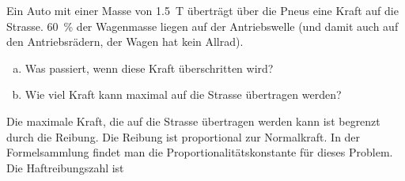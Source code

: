 \begin{aufgabe}
	Ein Auto mit einer Masse von \SI{1.5}{T} überträgt über die Pneus eine Kraft auf die Strasse.
	\SI{60}{\percent} der Wagenmasse liegen auf der Antriebswelle (und damit auch auf den Antriebsrädern, der Wagen hat kein Allrad).
	\begin{enumerate} [a)]
		\item Was passiert, wenn diese Kraft überschritten wird?
		\item Wie viel Kraft kann maximal auf die Strasse übertragen werden?
	\end{enumerate}
	\begin{loesung}
		Die maximale Kraft, die auf die Strasse übertragen werden kann ist begrenzt durch die Reibung.
		Die Reibung ist proportional zur Normalkraft. In der Formelsammlung findet man die Proportionalitätskonstante für dieses Problem.
		Die Haftreibungszahl ist
	\end{loesung}
\end{aufgabe}


